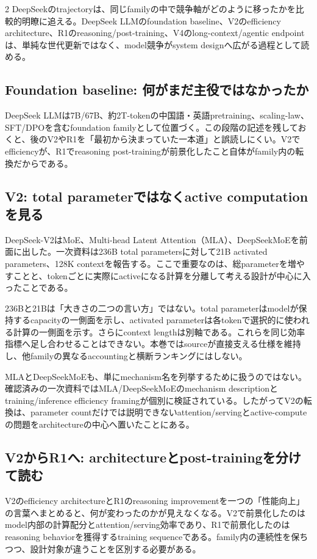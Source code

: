 \documentclass[lualatex,a4paper,10pt]{jlreq}
\begin{document}
\begin{multicols}{2}
\raggedcolumns
DeepSeekのtrajectoryは、同じfamilyの中で競争軸がどのように移ったかを比較的明瞭に追える。DeepSeek LLMのfoundation baseline、V2のefficiency architecture、R1のreasoning/post-training、V4のlong-context/agentic endpointは、単純な世代更新ではなく、model競争がsystem designへ広がる過程として読める。\autocite{deepseekllm,deepseekv2,deepseekr1,deepseekv4}

\subsection{Foundation baseline: 何がまだ主役ではなかったか}
DeepSeek LLMは7B/67B、約2T-tokenの中国語・英語pretraining、scaling-law、SFT/DPOを含むfoundation familyとして位置づく。この段階の記述を残しておくと、後のV2やR1を「最初から決まっていた一本道」と誤読しにくい。V2でefficiencyが、R1でreasoning post-trainingが前景化したこと自体がfamily内の転換だからである。\autocite{deepseekllm}

\subsection{V2: total parameterではなくactive computationを見る}
DeepSeek-V2はMoE、Multi-head Latent Attention（MLA）、DeepSeekMoEを前面に出した。一次資料は236B total parametersに対して21B activated parameters、128K contextを報告する。ここで重要なのは、総parameterを増やすことと、tokenごとに実際にactiveになる計算を分離して考える設計が中心に入ったことである。\autocite{deepseekv2}

236Bと21Bは「大きさの二つの言い方」ではない。total parameterはmodelが保持するcapacityの一側面を示し、activated parameterは各tokenで選択的に使われる計算の一側面を示す。さらにcontext lengthは別軸である。これらを同じ効率指標へ足し合わせることはできない。本巻ではsourceが直接支える仕様を維持し、他familyの異なるaccountingと横断ランキングにはしない。

MLAとDeepSeekMoEも、単にmechanism名を列挙するために扱うのではない。確認済みの一次資料ではMLA/DeepSeekMoEのmechanism descriptionとtraining/inference efficiency framingが個別に検証されている。したがってV2の転換は、parameter countだけでは説明できないattention/servingとactive-computeの問題をarchitectureの中心へ置いたことにある。\autocite{deepseekv2}

\subsection{V2からR1へ: architectureとpost-trainingを分けて読む}
V2のefficiency architectureとR1のreasoning improvementを一つの「性能向上」の言葉へまとめると、何が変わったのかが見えなくなる。V2で前景化したのはmodel内部の計算配分とattention/serving効率であり、R1で前景化したのはreasoning behaviorを獲得するtraining sequenceである。family内の連続性を保ちつつ、設計対象が違うことを区別する必要がある。


\end{multicols}
\end{document}

